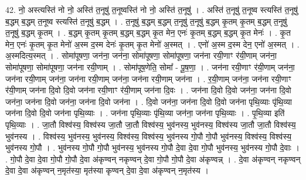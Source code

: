 \documentclass[17pt]{extarticle}
\begin{document}
42. नो॒ अस्त्यस्ति॑ नो नो॒ अस्ति॑ त॒नूषु॑ त॒नूष्वस्ति॑ नो नो॒ अस्ति॑ त॒नूषु॑ । . अस्ति॑ त॒नूषु॑ त॒नूष्व स्त्यस्ति॑ त॒नूषु॑ ब॒द्धम् ब॒द्धम् त॒नूष्व स्त्यस्ति॑ त॒नूषु॑ ब॒द्धम् । . त॒नूषु॑ ब॒द्धम् ब॒द्धम् त॒नूषु॑ त॒नूषु॑ ब॒द्धम् कृ॒तम् कृ॒तम् ब॒द्धम् त॒नूषु॑ त॒नूषु॑ ब॒द्धम् कृ॒तम् । . ब॒द्धम् कृ॒तम् कृ॒तम् ब॒द्धम् ब॒द्धम् कृ॒त मेन॒ एनः॑ कृ॒तम् ब॒द्धम् ब॒द्धम् कृ॒त मेनः॑ । . कृ॒त मेन॒ एनः॑ कृ॒तम् कृ॒त मेनो॑ अ॒स्म द॒स्म देनः॑ कृ॒तम् कृ॒त मेनो॑ अ॒स्मत् । . एनो॑ अ॒स्म द॒स्म देन॒ एनो॑ अ॒स्मत् । . अ॒स्मदित्य॒स्मत् । . सोमा॑पूषणा॒ जन॑ना॒ जन॑ना॒ सोमा॑पूषणा॒ सोमा॑पूषणा॒ जन॑ना रयी॒णाꣳ र॑यी॒णाम् जन॑ना॒ सोमा॑पूषणा॒ सोमा॑पूषणा॒ जन॑ना रयी॒णाम् । . सोमा॑पूष॒णेति॒ सोमा᳚ - पू॒ष॒णा॒ । . जन॑ना रयी॒णाꣳ र॑यी॒णाम् जन॑ना॒ जन॑ना रयी॒णाम् जन॑ना॒ जन॑ना रयी॒णाम् जन॑ना॒ जन॑ना रयी॒णाम् जन॑ना । . र॒यी॒णाम् जन॑ना॒ जन॑ना रयी॒णाꣳ र॑यी॒णाम् जन॑ना दि॒वो दि॒वो जन॑ना रयी॒णाꣳ र॑यी॒णाम् जन॑ना दि॒वः । . जन॑ना दि॒वो दि॒वो जन॑ना॒ जन॑ना दि॒वो जन॑ना॒ जन॑ना दि॒वो जन॑ना॒ जन॑ना दि॒वो जन॑ना । . दि॒वो जन॑ना॒ जन॑ना दि॒वो दि॒वो जन॑ना पृथि॒व्याः पृ॑थि॒व्या जन॑ना दि॒वो दि॒वो जन॑ना पृथि॒व्याः । . जन॑ना पृथि॒व्याः पृ॑थि॒व्या जन॑ना॒ जन॑ना पृथि॒व्याः । . पृ॒थि॒व्या इति॑ पृथि॒व्याः । . जा॒तौ विश्व॑स्य॒ विश्व॑स्य जा॒तौ जा॒तौ विश्व॑स्य॒ भुव॑नस्य॒ भुव॑नस्य॒ विश्व॑स्य जा॒तौ जा॒तौ विश्व॑स्य॒ भुव॑नस्य । . विश्व॑स्य॒ भुव॑नस्य॒ भुव॑नस्य॒ विश्व॑स्य॒ विश्व॑स्य॒ भुव॑नस्य गो॒पौ गो॒पौ भुव॑नस्य॒ विश्व॑स्य॒ विश्व॑स्य॒ भुव॑नस्य गो॒पौ । . भुव॑नस्य गो॒पौ गो॒पौ भुव॑नस्य॒ भुव॑नस्य गो॒पौ दे॒वा दे॒वा गो॒पौ भुव॑नस्य॒ भुव॑नस्य गो॒पौ दे॒वाः । . गो॒पौ दे॒वा दे॒वा गो॒पौ गो॒पौ दे॒वा अ॑कृण्वन् नकृण्वन् दे॒वा गो॒पौ गो॒पौ दे॒वा अ॑कृण्वन्न् । . दे॒वा अ॑कृण्वन् नकृण्वन् दे॒वा दे॒वा अ॑कृण्वन् न॒मृत॑स्या॒ मृत॑स्या कृण्वन् दे॒वा दे॒वा अ॑कृण्वन् न॒मृत॑स्य । \newline
\end{document}
